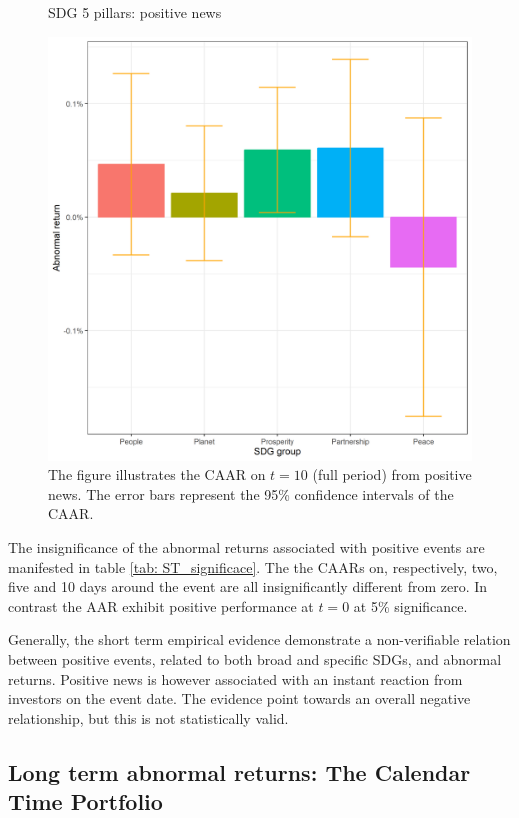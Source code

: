 \begin{figure} [H]
    \centering
    \caption{SDG 5 pillars: positive news}
    \includegraphics[scale=0.6]{Projekt/1.Figures analysis/ST_positive_sdg_bar_groups_0.png}
    \caption*{\footnotesize The figure illustrates the CAAR on $t = 10$ (full period) from positive news. The error bars represent the 95\% confidence intervals of the CAAR.}
    \label{fig:ST_pos_bar}
\end{figure}

The insignificance of the abnormal returns associated with positive events are manifested in table \ref{tab: ST_significace}. The the CAARs on, respectively, two, five and 10 days around the event are all insignificantly different from zero. In contrast the AAR exhibit positive performance at $t = 0$ at 5\% significance. 

Generally, the short term empirical evidence demonstrate a non-verifiable relation between positive events, related to both broad and specific SDGs, and abnormal returns. Positive news is however associated with an instant reaction from investors on the event date. The evidence point towards an overall negative relationship, but this is not statistically valid.  


\subsection{Long term abnormal returns: The Calendar Time Portfolio}


